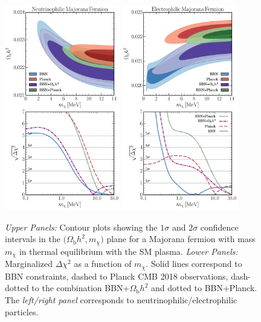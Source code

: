 \begin{figure}[t]
    \centering
    \hspace*{-0.2 cm}\includegraphics[width=0.45\textwidth]{figures/Nu_Maj_exclusion_and_deltachi.pdf} \quad
    \includegraphics[width=0.45\textwidth]{figures/EE_Maj_exclusion_and_deltachi.pdf}
    \caption{\emph{Upper Panels:} Contour plots showing the $1\sigma$ and $2\sigma$ confidence intervals in the $(\Omega_{\mathrm{b}} h^2$,\,$m_\chi)$ plane for a Majorana fermion with mass $m_\chi$ in thermal equilibrium with the SM plasma. \emph{Lower Panels:} Marginalized $\Delta \chi^2$ as a function of $m_\chi$. Solid lines correspond to BBN constraints, dashed to Planck CMB 2018 observations, dash-dotted to the combination BBN+$\Omega_{\mathrm{b}}h^2$ and dotted to BBN+Planck. The \textit{left/right panel} corresponds to neutrinophilic/electrophilic particles.}
    \label{fig:Current_1-2D}
\end{figure}

